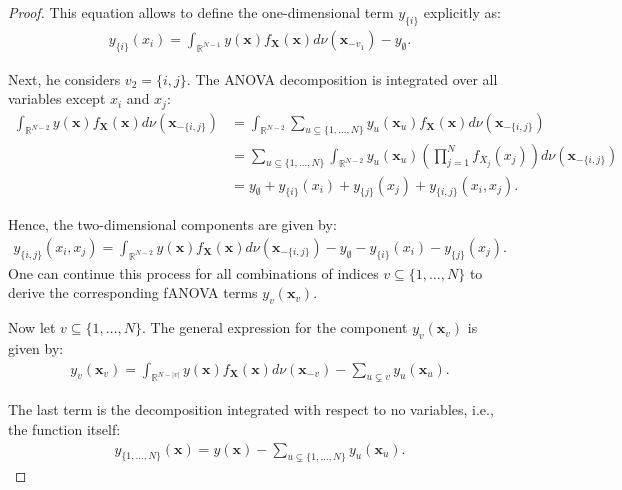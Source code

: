 \begin{proof}
This equation allows to define the one-dimensional term \( y_{\{i\}} \) explicitly as:
\begin{align*}
    y_{\{i\}}(x_i) = \int_{\mathbb{R}^{N-1}} y(\boldsymbol{x}) f_{\boldsymbol{X}}(\boldsymbol{x}) d\nu (\boldsymbol{x}_{-v_1}) - y_{\emptyset}.
\end{align*}

Next, he considers $v_2 = \{i, j\}$. The ANOVA decomposition is integrated over all variables except $x_i$ and $x_j$:
\begin{align*}
    \int_{\mathbb{R}^{N-2}} y(\boldsymbol{x}) f_{\boldsymbol{X}}(\boldsymbol{x}) d\nu(\boldsymbol{x}_{-\{i,j\}}) 
    &= \int_{\mathbb{R}^{N-2}} \sum_{u \subseteq \{1, \dots, N\}} y_u(\boldsymbol{x}_u) f_{\boldsymbol{X}}(\boldsymbol{x}) d\nu(\boldsymbol{x}_{-\{i,j\}}) \\
    &= \sum_{u \subseteq \{1, \dots, N\}} \int_{\mathbb{R}^{N-2}} y_u(\boldsymbol{x}_u) \left( \prod_{j=1}^N f_{X_j}(x_j) \right) d\nu(\boldsymbol{x}_{-\{i,j\}}) \\
    &= y_{\emptyset} + y_{\{i\}}(x_i) + y_{\{j\}}(x_j) + y_{\{i,j\}}(x_i, x_j).
\end{align*}

Hence, the two-dimensional components are given by:
\begin{align*}
    y_{\{i,j\}}(x_i, x_j) 
    = \int_{\mathbb{R}^{N-2}} y(\boldsymbol{x}) f_{\boldsymbol{X}}(\boldsymbol{x}) d\nu(\boldsymbol{x}_{-\{i,j\}})
    - y_{\emptyset} - y_{\{i\}}(x_i) - y_{\{j\}}(x_j).
\end{align*}
One can continue this process for all combinations of indices \( v \subseteq \{1, \ldots, N\} \) to derive the corresponding fANOVA terms \( y_v(\boldsymbol{x}_v) \).\par
Now let \( v \subseteq \{1, \ldots, N\} \). The general expression for the component \( y_v(\boldsymbol{x}_v) \) is given by:
\begin{align*}
    y_v(\boldsymbol{x}_v) = \int_{\mathbb{R}^{N - |v|}} y(\boldsymbol{x}) f_{\boldsymbol{X}}(\boldsymbol{x}) d\nu(\boldsymbol{x}_{-v}) 
    - \sum_{u \subsetneq v} y_u(\boldsymbol{x}_u).
\end{align*}

The last term is the decomposition integrated with respect to no variables, i.e., the function itself:
\begin{align*}
    y_{\{1, \ldots, N\}}(\boldsymbol{x}) = y(\boldsymbol{x}) 
    - \sum_{u \subsetneq \{1, \ldots, N\}} y_u(\boldsymbol{x}_u).
\end{align*}


\end{proof}
